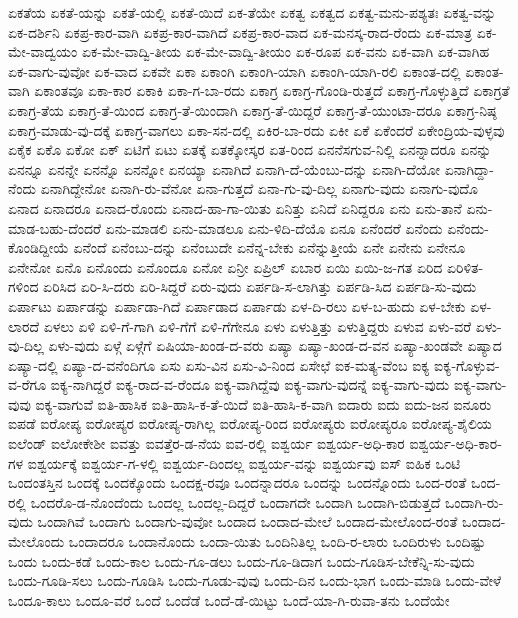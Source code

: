 ಏಕತೆಯ
ಏಕತೆ-ಯನ್ನು
ಏಕತೆ-ಯಲ್ಲಿ
ಏಕತೆ-ಯಿದೆ
ಏಕ-ತೆಯೇ
ಏಕತ್ವ
ಏಕತ್ವದ
ಏಕತ್ವ-ಮನು-ಪಶ್ಯತಃ
ಏಕತ್ವ-ವನ್ನು
ಏಕ-ದರ್ಶಿನಿ
ಏಕಪ್ರ-ಕಾರ-ವಾಗಿ
ಏಕಪ್ರ-ಕಾರ-ವಾಗಿದೆ
ಏಕಪ್ರ-ಕಾರ-ವಾದ
ಏಕ-ಮನಸ್ಕ-ರಾದ-ರೆಂದು
ಏಕ-ಮಾತ್ರ
ಏಕ-ಮೇ-ವಾದ್ವಯಂ
ಏಕ-ಮೇ-ವಾದ್ವಿ-ತೀಯ
ಏಕ-ಮೇ-ವಾದ್ವಿ-ತೀಯಂ
ಏಕ-ರೂಪ
ಏಕ-ವನು
ಏಕ-ವಾಗಿ
ಏಕ-ವಾಗಿಹ
ಏಕ-ವಾಗು-ವುವೋ
ಏಕ-ವಾದ
ಏಕವೇ
ಏಕಾ
ಏಕಾಂಗಿ
ಏಕಾಂಗಿ-ಯಾಗಿ
ಏಕಾಂಗಿ-ಯಾಗಿ-ರಲಿ
ಏಕಾಂತ-ದಲ್ಲಿ
ಏಕಾಂತ-ವಾಗಿ
ಏಕಾಂತವೂ
ಏಕಾ-ಕಾರ
ಏಕಾಕಿ
ಏಕಾ-ಗ-ಬಾ-ರದು
ಏಕಾಗ್ರ
ಏಕಾಗ್ರ-ಗೊಂಡಿ-ರುತ್ತದೆ
ಏಕಾಗ್ರ-ಗೊಳ್ಳುತ್ತಿದೆ
ಏಕಾಗ್ರತೆ
ಏಕಾಗ್ರ-ತೆಯ
ಏಕಾಗ್ರ-ತೆ-ಯಿಂದ
ಏಕಾಗ್ರ-ತೆ-ಯಿಂದಾಗಿ
ಏಕಾಗ್ರ-ತೆ-ಯಿದ್ದರೆ
ಏಕಾಗ್ರ-ತೆ-ಯುಂಟಾ-ದರೂ
ಏಕಾಗ್ರ-ನಿಷ್ಠ
ಏಕಾಗ್ರ-ಮಾಡು-ವು-ದಕ್ಕೆ
ಏಕಾಗ್ರ-ವಾಗಲು
ಏಕಾ-ಸನ-ದಲ್ಲಿ
ಏಕಿರ-ಬಾ-ರದು
ಏಕೀ
ಏಕೆ
ಏಕೆಂದರೆ
ಏಕೇಂದ್ರಿಯ-ವುಳ್ಳವು
ಏಕೈಕ
ಏಕೊ
ಏಕೋ
ಏಕ್
ಏಟಿಗೆ
ಏಟು
ಏತಕ್ಕೆ
ಏತಕ್ಕೋಸ್ಕರ
ಏತ-ರಿಂದ
ಏನನೆಸಗುವ-ನಿಲ್ಲಿ
ಏನನ್ನಾದರೂ
ಏನನ್ನು
ಏನನ್ನೂ
ಏನನ್ನೇ
ಏನನ್ನೊ
ಏನನ್ನೋ
ಏನಯ್ಯಾ
ಏನಾಗಿದೆ
ಏನಾಗಿ-ದೆ-ಯೆಂಬು-ದನ್ನು
ಏನಾಗಿ-ದೆಯೋ
ಏನಾಗಿದ್ದಾ-ನೆಂದು
ಏನಾಗಿದ್ದೇನೋ
ಏನಾಗಿ-ರು-ವೆನೋ
ಏನಾ-ಗುತ್ತದೆ
ಏನಾ-ಗು-ವು-ದಿಲ್ಲ
ಏನಾಗು-ವುದು
ಏನಾಗು-ವುದೊ
ಏನಾದ
ಏನಾದರೂ
ಏನಾದ-ರೊಂದು
ಏನಾದ-ಹಾ-ಗಾ-ಯಿತು
ಏನಿತ್ತು
ಏನಿದೆ
ಏನಿದ್ದರೂ
ಏನು
ಏನು-ತಾನೆ
ಏನು-ಮಾಡ-ಬಹು-ದೆಂದರೆ
ಏನು-ಮಾಡಲಿ
ಏನು-ಮಾಡಲೂ
ಏನು-ಳಿದಿ-ದೆಯೊ
ಏನೂ
ಏನೆಂದರೆ
ಏನೆಂದು
ಏನೆಂದು-ಕೊಂಡಿದ್ದೀಯೆ
ಏನೆಂದೆ
ಏನೆಂಬು-ದನ್ನು
ಏನೆಂಬುದೇ
ಏನೆನ್ನ-ಬೇಕು
ಏನೆನ್ನುತ್ತೀಯೆ
ಏನೇ
ಏನೇನು
ಏನೇನೂ
ಏನೇನೋ
ಏನೊ
ಏನೊಂದು
ಏನೊಂದೂ
ಏನೋ
ಏನ್ರೀ
ಏಪ್ರಿಲ್
ಏಬಾರ
ಏಯಿ
ಏಯಿ-ಜ-ಗತ
ಏರಿದ
ಏರಿಳಿತ-ಗಳಿಂದ
ಏರಿಸಿದ
ಏರಿ-ಸಿ-ದರು
ಏರಿ-ಸಿದ್ದರೆ
ಏರು-ವುದು
ಏರ್ಪಡಿ-ಸ-ಲಾಗಿತ್ತು
ಏರ್ಪಡಿ-ಸಿದ
ಏರ್ಪಡಿ-ಸು-ವುದು
ಏರ್ಪಾಟು
ಏರ್ಪಾಡನ್ನು
ಏರ್ಪಾಡಾ-ಗಿದೆ
ಏರ್ಪಾಡಾದ
ಏರ್ಪಾಡು
ಏಳ-ದಿ-ರಲು
ಏಳ-ಬ-ಹುದು
ಏಳ-ಬೇಕು
ಏಳ-ಲಾರದೆ
ಏಳಲು
ಏಳಿ
ಏಳಿ-ಗೆ-ಗಾಗಿ
ಏಳಿ-ಗೆಗೆ
ಏಳಿ-ಗೆಗೇನೂ
ಏಳು
ಏಳುತ್ತಿತ್ತು
ಏಳುತ್ತಿದ್ದರು
ಏಳುವ
ಏಳು-ವರೆ
ಏಳು-ವು-ದಿಲ್ಲ
ಏಳು-ವುದು
ಏಳ್ಗೆ
ಏಳ್ಗೆಗೆ
ಏಷಿಯಾ-ಖಂಡ-ದ-ವರು
ಏಷ್ಯಾ
ಏಷ್ಯಾ-ಖಂಡ-ದ-ವನ
ಏಷ್ಯಾ-ಖಂಡವೇ
ಏಷ್ಯಾದ
ಏಷ್ಯಾ-ದಲ್ಲಿ
ಏಷ್ಯಾ-ದ-ವನೆಂದಿಗೂ
ಏಸು
ಏಸು-ವಿನ
ಏಸು-ವಿ-ನಿಂದ
ಏಸೇಛೆ
ಐಕ-ಮತ್ಯ-ವೆಂಬ
ಐಕ್ಯ
ಐಕ್ಯ-ಗೊಳ್ಳುವ-ವ-ರೆಗೂ
ಐಕ್ಯ-ನಾಗಿದ್ದರೆ
ಐಕ್ಯ-ರಾದ-ವ-ರೆಂದೂ
ಐಕ್ಯ-ವಾಗಿದ್ದೆವು
ಐಕ್ಯ-ವಾಗು-ವುದನ್ನೆ
ಐಕ್ಯ-ವಾಗು-ವುದು
ಐಕ್ಯ-ವಾಗು-ವುವು
ಐಕ್ಯ-ವಾಗುವೆ
ಐತಿ-ಹಾಸಿಕ
ಐತಿ-ಹಾಸಿ-ಕ-ತೆ-ಯಿದೆ
ಐತಿ-ಹಾಸಿ-ಕ-ವಾಗಿ
ಐದಾರು
ಐದು
ಐದು-ಜನ
ಐನೂರು
ಐಪಡೆ
ಐರೋಪ್ಯ
ಐರೋಪ್ಯರ
ಐರೋಪ್ಯ-ರಾಗಿಲ್ಲ
ಐರೋಪ್ಯ-ರಿಂದ
ಐರೋಪ್ಯರು
ಐರೋಪ್ಯರೂ
ಐರೋಪ್ಯ-ಶೈಲಿಯ
ಐಲೆಂಡ್
ಐಲೋಕೇಶೀ
ಐವತ್ತು
ಐವತ್ತೆರ-ಡ-ನೆಯ
ಐವ-ರಲ್ಲಿ
ಐಶ್ವರ್ಯ
ಐಶ್ವರ್ಯ-ಅಧಿ-ಕಾರ
ಐಶ್ವರ್ಯ-ಅಧಿ-ಕಾರ-ಗಳ
ಐಶ್ವರ್ಯಕ್ಕೆ
ಐಶ್ವರ್ಯ-ಗ-ಳಲ್ಲಿ
ಐಶ್ವರ್ಯ-ದಿಂದಲ್ಲ
ಐಶ್ವರ್ಯ-ವನ್ನು
ಐಶ್ವರ್ಯವು
ಐಸ್
ಐಹಿಕ
ಒಂಟಿ
ಒಂದಂತಸ್ತಿನ
ಒಂದಕ್ಕೆ
ಒಂದಕ್ಕೊಂದು
ಒಂದಕ್ಷ-ರವೂ
ಒಂದನ್ನಾದರೂ
ಒಂದನ್ನು
ಒಂದನ್ನೊಂದು
ಒಂದ-ರಂತೆ
ಒಂದ-ರಲ್ಲಿ
ಒಂದರೊ-ಡ-ನೊಂದೆಂದು
ಒಂದಲ್ಲ
ಒಂದಲ್ಲ-ದಿದ್ದರೆ
ಒಂದಾಗದೇ
ಒಂದಾಗಿ
ಒಂದಾಗಿ-ಬಿಡುತ್ತದೆ
ಒಂದಾಗಿ-ರು-ವುದು
ಒಂದಾಗಿವೆ
ಒಂದಾಗು
ಒಂದಾಗು-ವುವೋ
ಒಂದಾದ
ಒಂದಾದ-ಮೇಲೆ
ಒಂದಾದ-ಮೇಲೊಂದ-ರಂತೆ
ಒಂದಾದ-ಮೇಲೊಂದು
ಒಂದಾದರೂ
ಒಂದಾನೊಂದು
ಒಂದಾ-ಯಿತು
ಒಂದಿನಿತಿಲ್ಲ
ಒಂದಿ-ರ-ಲಾರು
ಒಂದಿರುಳು
ಒಂದಿಷ್ಟು
ಒಂದು
ಒಂದು-ಕಡೆ
ಒಂದು-ಕಾಲ
ಒಂದು-ಗೂ-ಡಲು
ಒಂದು-ಗೂ-ಡಿದಾಗ
ಒಂದು-ಗೂಡಿಸ-ಬೇಕೆನ್ನಿ-ಸು-ವುದು
ಒಂದು-ಗೂಡಿ-ಸಲು
ಒಂದು-ಗೂಡಿಸಿ
ಒಂದು-ಗೂಡು-ವುವು
ಒಂದು-ದಿನ
ಒಂದು-ಭಾಗ
ಒಂದು-ಮಾಡಿ
ಒಂದು-ವೇಳೆ
ಒಂದೂ-ಕಾಲು
ಒಂದೂ-ವರೆ
ಒಂದೆ
ಒಂದೆಡೆ
ಒಂದೆ-ಡೆ-ಯಿಟ್ಟು
ಒಂದೆ-ಯಾ-ಗಿ-ರುವಾ-ತನು
ಒಂದೆಯೇ
